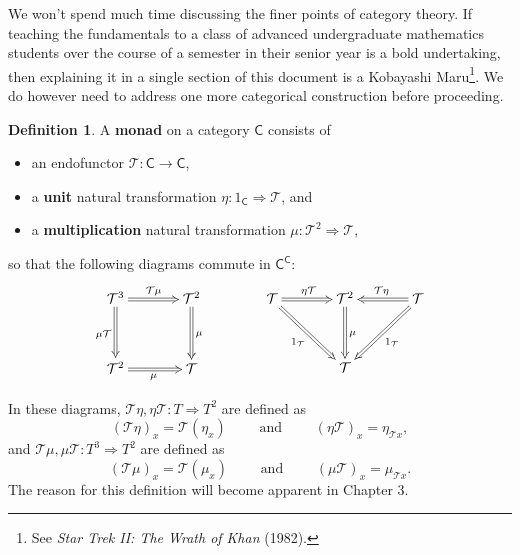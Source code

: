\documentclass[MS, xcolor=dvipsnames]{wfuthesis}
\def\sC{\mathsf{C}}
\def\cT{\mathcal{T}}
\def\and{\text{ and }}
\theoremstyle{definition}
\newtheorem{definition}[theorem]{Definition}
\begin{document}
We won't spend much time discussing the finer points of category theory. If teaching the fundamentals to a class of advanced undergraduate mathematics students over the course of a semester in their senior year is a bold undertaking, then explaining it in a single section of this document is a Kobayashi Maru\footnote{See \textit{Star Trek II: The Wrath of Khan} (1982).}. We do however need to address one more categorical construction before proceeding. 
\begin{definition}
  A \textbf{monad} on a category $\sC$ consists of 
  \begin{itemize}
    \item an endofunctor $\cT: \sC \to \sC$,
    \item a \textbf{unit} natural transformation $\eta: 1_\sC \Rightarrow \cT$, and 
    \item a \textbf{multiplication} natural transformation $\mu: \cT^2 \Rightarrow \cT$,
  \end{itemize}
  so that the following diagrams commute in $\sC^\sC$: 
\[ \SelectTips{cm}{}\xymatrix@R+1pc@C+1pc{
  \cT^3 \ar@{=>}[r]^{\cT\mu} \ar@{=>}[d]_{\mu \cT} & \cT^2 \ar@{=>}[d]^\mu \\ \cT^2 \ar@{=>}[r]_\mu & \cT
} \qquad\qquad \SelectTips{cm}{}\xymatrix@R+1pc@C+1pc{
  \cT \ar@{=>}[r]^{\eta \cT} \ar@{=>}[dr]_{1_\cT} & \cT^2 \ar@{=>}[d]^\mu & \cT \ar@{=>}[l]_{\cT\eta} \ar@{=>}[dl]^{1_\cT} \\ & \cT &
} \]
\end{definition}
In these diagrams, $\cT\eta,\eta\cT: T \Rightarrow T^2$ are defined as 
\[ (\cT\eta)_x = \cT(\eta_x) \qquad\and\qquad (\eta\cT)_x = \eta_{\cT x}, \]
and $\cT\mu,\mu\cT: T^3 \Rightarrow T^2$ are defined as 
\[ (\cT\mu)_x = \cT(\mu_x) \qquad\and\qquad (\mu\cT)_x = \mu_{\cT x}. \]
The reason for this definition will become apparent in Chapter 3. 
\end{document}
